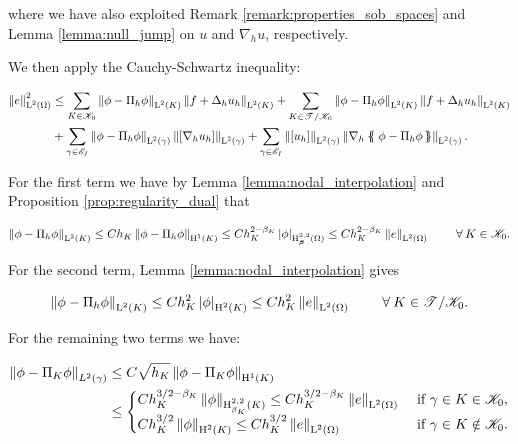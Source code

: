 \documentclass[a4paper,11pt]{article}
\begin{document}
where we have also exploited Remark \ref{remark:properties_sob_spaces} and Lemma \ref{lemma:null_jump} on $u$ and $\nabla_{h} u$, respectively. 

We then apply the Cauchy-Schwartz inequality:

\begin{equation}
\begin{split}
\Norm{e}^2_{\leb{2}(\Omega)} &\leq  \sum_{K \in \cK_{0}} \Norm{\phi -  \Pi_{h}\phi}_{\leb{2}(K)} \Norm{f + \Delta_{h} u_{h}}_{\leb{2}(K)} + \sum_{K \in \T{} \slash \cK_{0}} \Norm{\phi -  \Pi_{h}\phi}_{\leb{2}(K)} \Norm{f + \Delta_{h} u_{h}}_{\leb{2}(K)} \\
&+ \sum_{\gamma \in \cE_{I}}  \Norm{\phi -  \Pi_{h}\phi}_{\leb{2}(\gamma)}\Norm{\jump{\nabla_{h} u_{h}}}_{\leb{2}(\gamma)} + \sum_{\gamma \in \cE_{I}} \Norm{\jump{u_{h}}}_{\leb{2}(\gamma)} \Norm{\nabla_{h} \avg{\phi -  \Pi_{h}\phi}}_{\leb{2}(\gamma)}.
\end{split}
\label{a-posteriori-ineq}
\end{equation}

For the first term we have by Lemma \ref{lemma:nodal_interpolation} and Proposition \ref{prop:regularity_dual} that

\begin{equation}
 \left\|\phi -  \Pi_{h}\phi\right\|_{\operatorname L^{2}(K)} \leq  C h_{K}\left\|\phi -  \Pi_{h}\phi\right\|_{\operatorname H^{1}(K)} \leq C h_{K}^{2-\beta_{K}}\left|\phi\right|_{\operatorname H^{2,2}_{\boldsymbol \beta}(\Omega)} \leq C h_{K}^{2-\beta_{K}} \left\|e\right\|_{\operatorname L^{2}(\Omega)} \quad  \quad\:\forall\: K \in \mathscr K_{0}.   
\label{eq:interp_ineq_weighted}
\end{equation}

For the second term, Lemma \ref{lemma:nodal_interpolation} gives

\begin{equation}
   \left\|\phi -  \Pi_{h}\phi\right\|_{\operatorname L^{2}(K)} \leq C h_{K}^{2}\left|\phi\right|_{\operatorname H^{2}(K)} \leq C h_{K}^{2} \left\|e\right\|_{\operatorname L^{2}(\Omega)} \quad  \quad\:\forall\: K \in \mathscr T^{} \slash \mathscr K_{0}. 
\label{eq:interp_ineq}
\end{equation}

For the remaining two terms we have:

\begin{equation}
\begin{split}
\left\|\phi - \Pi_{K}\phi\right\|_{L^{2}(\gamma)} &\leq C \sqrt{h_{K}} \left\|\phi - \Pi_{K}\phi\right\|_{\operatorname H^{1}(K)} \\
&\leq \begin{cases}
C h_{K}^{3/2-\beta_{K}} \left\|\phi\right\|_{\operatorname H^{2,2}_{\beta_{K}}(K)} \leq C h_{K}^{3/2-\beta_{K}} \left\|e\right\|_{\operatorname L^{2}(\Omega)} & \text{ if } \gamma \in K \in \mathscr K_{0},\\
C h_{K}^{3/2} \left\|\phi\right\|_{\operatorname H^{2}(K)} \leq C h_{K}^{3/2} \left\|e\right\|_{\operatorname L^{2}(\Omega)} & \text{ if } \gamma \in K \notin \mathscr K_{0}.
\end{cases}
\end{split}
\label{eq:trace_ineq}
\end{equation}
\end{document}
